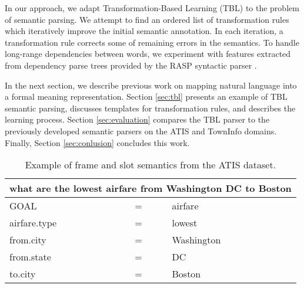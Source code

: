 \documentclass{article}
\begin{document}

In our approach, we adapt Transformation-Based Learning (TBL) \cite{brill95} to the problem of semantic parsing. We attempt to find an ordered list of transformation rules which iteratively improve the initial semantic annotation. 
In each iteration, a transformation rule corrects some of remaining errors in the semantics.
To handle long-range dependencies between words, we experiment with features extracted from dependency parse trees provided by the RASP syntactic parser \cite{rasp06}.


In the next section, we describe previous work on mapping natural language into a formal meaning representation. Section \ref{sec:tbl} presents an example of TBL semantic parsing, discusses templates for transformation rules, and describes the learning process. Section \ref{sec:evaluation} compares the TBL parser to the previously developed semantic parsers on the ATIS \cite{atis94} and TownInfo \cite{mairesse09} domains. Finally, Section \ref{sec:conlusion} concludes this work.

\begin{table}
\begin{center}
\begin{tabular}{lll} 
  \multicolumn{3}{l}{what are the lowest airfare from Washington DC to Boston} \\
  \hline
  GOAL          & = & airfare \\
  airfare.type  & = & lowest \\
  from.city     & = & Washington \\
  from.state    & = & DC \\
  to.city       & = & Boston \\
\end{tabular} 
\end{center}
\vspace{-0.5cm}
\caption{Example of frame and slot semantics from the ATIS \cite{atis94} dataset.}
\label{tbl:sem:example}
\end{table}
\end{document}
